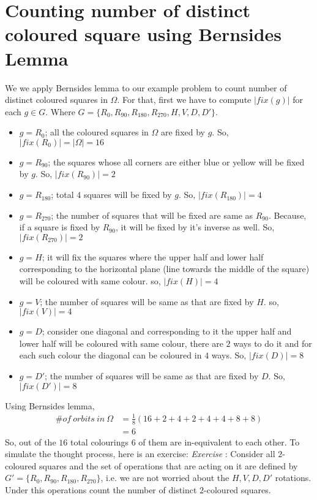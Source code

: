{\section{Counting number of distinct coloured square using Bernsides Lemma}
We we apply Bernsides lemma to our example problem to count number of distinct coloured squares in $\Omega$. For that, first we have to compute $|fix(g)|$ for each $g\in G$. Where $G=\{R_0,R_{90},R_{180},R_{270},H,V,D,D'\}  $.
\begin{itemize}
\item $g=R_0$; all the coloured squares in $\Omega$ are fixed by $g$. So, $|fix(R_0)|=|\Omega|=16$
\item $g=R_{90}$; the squares whose all corners are either blue or yellow will be fixed by $g$. So, $|fix(R_{90})|=2 $
\item $g=R_{180}$; total $4$ squares will be fixed  by $g$. So, $|fix(R_{180})|=4 $
\item $g=R_{270}$; the number of squares that will be fixed are same as $R_{90}$. Because, if a square is fixed by $R_{90}$, it will be fixed by it's inverse as well. So, $|fix(R_{270})|=2 $
\item $g=H$; it will fix the squares where the upper half and lower half corresponding to the horizontal plane (line towards the middle of the square) will be coloured with same colour. so, $|fix(H)|=4 $
\item $g=V$; the number of squares will be same as that are fixed by $H$. so, $|fix(V)|=4 $
\item $g=D$; consider one diagonal and corresponding to it the upper half and lower half will be coloured with same colour, there are $2$ ways to do it and for each such colour the diagonal can be coloured in $4$ ways. So, $|fix(D)|=8 $
\item $g=D'$; the number of squares will be same as that are fixed by $D$. So, $|fix(D')|=8$
\end{itemize}
Using Bernsides lemma,
\begin{align*}
\#of \ orbits \ in \ \Omega&=\frac{1}{8}(16+2+4+2+4+4+8+8)\\
&=6
\end{align*}
So, out of the $16$ total colourings $6$ of them are in-equivalent to each other. To simulate the thought process, here is an exercise:
\emph{Exercise} : Consider all $2$-coloured squares and the set of operations that are acting on it are defined by $G'=\{R_0,R_{90},R_{180},R_{270}\}$, i.e. we are not worried about the $H,V,D,D'$ rotations. Under this operations count the number of distinct $2$-coloured squares. 
\\

}
